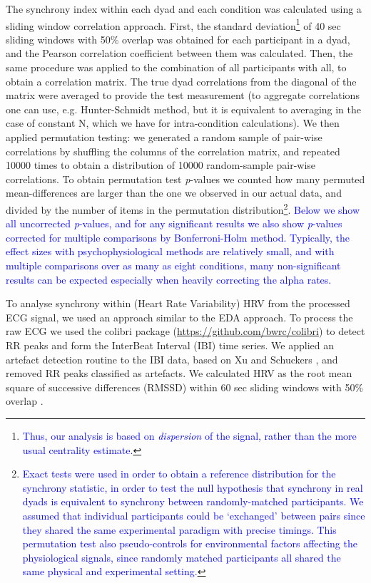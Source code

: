 \documentclass[manuscript, review = false, screen]{acmart}
\begin{document}
The synchrony index within each dyad and each condition was calculated using a sliding window correlation approach. First, the standard deviation\footnote{\textcolor{blue}{Thus, our analysis is based on {\it dispersion} of the signal, rather than the more usual centrality estimate.}} of 40 sec sliding windows with 50$\%$ overlap was obtained for each participant in a dyad, and the Pearson correlation coefficient between them was calculated. Then, the same procedure was applied to the combination of all participants with all, to obtain a correlation matrix. The true dyad correlations from the diagonal of the matrix were averaged to provide the test measurement (to aggregate correlations one can use, e.g. Hunter-Schmidt method, but it is equivalent to averaging in the case of constant N, which we have for intra-condition calculations). We then applied permutation testing: we generated a random sample of pair-wise correlations by shuffling the columns of the correlation matrix, and repeated 10000 times to obtain a distribution of 10000 random-sample pair-wise correlations. To obtain permutation test {\it p}-values we counted how many permuted mean-differences are larger than the one we observed in our actual data, and divided by the number of items in the permutation distribution\footnote{\textcolor{blue}{Exact tests were used in order to obtain a reference distribution for the synchrony statistic, in order to test the null hypothesis that synchrony in real dyads is equivalent to synchrony between randomly-matched participants. We assumed that individual participants could be `exchanged' between pairs since they shared the same experimental paradigm with precise timings. This permutation test also pseudo-controls for environmental factors affecting the physiological signals, since randomly matched participants all shared the same physical and experimental setting.}}. \textcolor{blue}{Below we show all uncorrected {\it p}-values, and for any significant results we also show {\it p}-values corrected for multiple comparisons by Bonferroni-Holm method. Typically, the effect sizes with psychophysiological methods are relatively small, and with multiple comparisons over as many as eight conditions, many non-significant results can be expected especially when heavily correcting the alpha rates.}

To analyse synchrony within (Heart Rate Variability) HRV from the processed ECG signal, we used an approach similar to the EDA approach. To process the raw ECG we used the {\sf colibri} package (\url{https://github.com/bwrc/colibri}) to detect RR peaks and form the InterBeat Interval (IBI) time series. We applied an artefact detection routine to the IBI data, based on Xu and Schuckers \cite{xu_automatic_2001}, and removed RR peaks classified as artefacts. We calculated HRV as the root mean square of successive differences (RMSSD) within 60 sec sliding windows with 50\% overlap \cite{Malik_Bigger_Camm_Kleiger_Malliani_Moss_Schwartz_1996}. 
\end{document}
